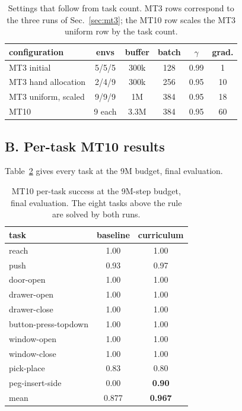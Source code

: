 \documentclass[letterpaper, 10 pt, conference]{ieeeconf}
\begin{document}
\begin{table}[tb]
\caption{Settings that follow from task count. MT3 rows correspond to the three runs of
Sec.~\ref{sec:mt3}; the MT10 row scales the MT3 uniform row by the task count.}
\label{tab:hparams}
\vspace{-0.5cm}
\begin{center}
\small
\begin{tabular}{lccccc}
\toprule
configuration & envs & buffer & batch & $\gamma$ & grad. \\
\midrule
MT3 initial         & 5/5/5   & 300k & 128 & 0.99 & 1  \\
MT3 hand allocation & 2/4/9   & 300k & 256 & 0.95 & 10 \\
MT3 uniform, scaled & 9/9/9   & 1M   & 384 & 0.95 & 18 \\
MT10                & 9 each  & 3.3M & 384 & 0.95 & 60 \\
\bottomrule
\end{tabular}
\vspace{-0.7cm}
\end{center}
\end{table}

\subsection*{B. Per-task MT10 results}

Table~\ref{tab:pertask} gives every task at the 9M budget, final evaluation.

\begin{table}[b]
\vspace{-0.2cm}
\caption{MT10 per-task success at the 9M-step budget, final evaluation. The eight tasks
above the rule are solved by both runs.}
\label{tab:pertask}
\vspace{-0.2cm}
\begin{center}
\small
\begin{tabular}{lcc}
\toprule
task & baseline & curriculum \\
\midrule
reach                & 1.00 & 1.00 \\
push                 & 0.93 & 0.97 \\
door-open            & 1.00 & 1.00 \\
drawer-open          & 1.00 & 1.00 \\
drawer-close         & 1.00 & 1.00 \\
button-press-topdown & 1.00 & 1.00 \\
window-open          & 1.00 & 1.00 \\
window-close         & 1.00 & 1.00 \\
\midrule
pick-place           & 0.83 & 0.80 \\
peg-insert-side      & 0.00 & \textbf{0.90} \\
\midrule
mean                 & 0.877 & \textbf{0.967} \\
\bottomrule
\end{tabular}
\end{center}
\end{table}
\end{document}
